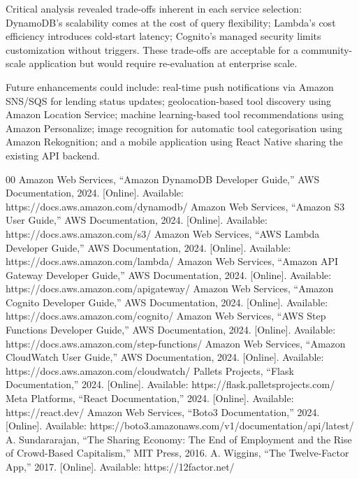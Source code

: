 \documentclass[conference]{IEEEtran}
\begin{document}
Critical analysis revealed trade-offs inherent in each service selection: DynamoDB's scalability comes at the cost of query flexibility; Lambda's cost efficiency introduces cold-start latency; Cognito's managed security limits customization without triggers. These trade-offs are acceptable for a community-scale application but would require re-evaluation at enterprise scale.

Future enhancements could include: real-time push notifications via Amazon SNS/SQS for lending status updates; geolocation-based tool discovery using Amazon Location Service; machine learning-based tool recommendations using Amazon Personalize; image recognition for automatic tool categorisation using Amazon Rekognition; and a mobile application using React Native sharing the existing API backend.

\begin{thebibliography}{00}
 Amazon Web Services, ``Amazon DynamoDB Developer Guide,'' AWS Documentation, 2024. [Online]. Available: https://docs.aws.amazon.com/dynamodb/
 Amazon Web Services, ``Amazon S3 User Guide,'' AWS Documentation, 2024. [Online]. Available: https://docs.aws.amazon.com/s3/
 Amazon Web Services, ``AWS Lambda Developer Guide,'' AWS Documentation, 2024. [Online]. Available: https://docs.aws.amazon.com/lambda/
 Amazon Web Services, ``Amazon API Gateway Developer Guide,'' AWS Documentation, 2024. [Online]. Available: https://docs.aws.amazon.com/apigateway/
 Amazon Web Services, ``Amazon Cognito Developer Guide,'' AWS Documentation, 2024. [Online]. Available: https://docs.aws.amazon.com/cognito/
 Amazon Web Services, ``AWS Step Functions Developer Guide,'' AWS Documentation, 2024. [Online]. Available: https://docs.aws.amazon.com/step-functions/
 Amazon Web Services, ``Amazon CloudWatch User Guide,'' AWS Documentation, 2024. [Online]. Available: https://docs.aws.amazon.com/cloudwatch/
 Pallets Projects, ``Flask Documentation,'' 2024. [Online]. Available: https://flask.palletsprojects.com/
 Meta Platforms, ``React Documentation,'' 2024. [Online]. Available: https://react.dev/
 Amazon Web Services, ``Boto3 Documentation,'' 2024. [Online]. Available: https://boto3.amazonaws.com/v1/documentation/api/latest/
 A. Sundararajan, ``The Sharing Economy: The End of Employment and the Rise of Crowd-Based Capitalism,'' MIT Press, 2016.
 A. Wiggins, ``The Twelve-Factor App,'' 2017. [Online]. Available: https://12factor.net/
\end{thebibliography}
\end{document}
